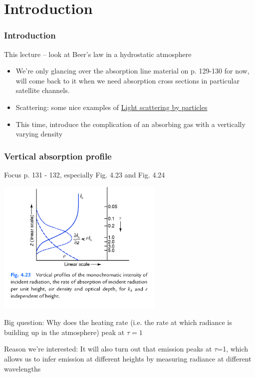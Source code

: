 \documentclass[hyperref={colorlinks=true,linkcolor=blue,urlcolor=blue},numbers]{beamer}
\begin{document}
\graphicspath{{./figs_wh/}}

\section{Introduction}
\label{sec:introduction}

\begin{frame}
  \frametitle{Introduction}

This lecture -- look at Beer's law in a hydrostatic atmosphere

  \begin{itemize}

 \item We're only glancing over the  absorption line material on p. 129-130 for now, will come back to
it when we need absorption cross sections in particular satellite channels.

 \item Scattering: some nice examples of \href{http://www.met.reading.ac.uk/clouds/maxwell}{Light scattering by particles}

\item This time, introduce the complication of an absorbing gas with a vertically varying density

  \end{itemize}


\end{frame}


\begin{frame}
  \frametitle{Vertical absorption profile}
Focus p. 131 - 132, especially Fig. 4.23 and Fig. 4.24

\includegraphics[width=0.6\textwidth]{vert_absorb.png}

Big question:  Why does the heating rate (i.e. the rate at which radiance is
building up in the atmosphere) peak at $\tau=1$

Reason we're interested:  It will also turn out that emission peaks at $\tau$=1,
which allows us to infer emission at different heights by measuring radiance at
different wavelengths

\end{frame}
\end{document}
